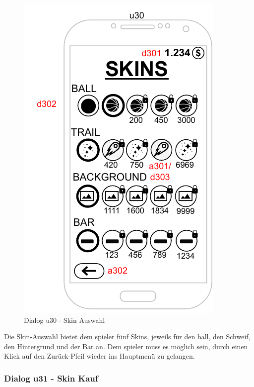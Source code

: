 \begin{figure}
    \begin{center}
    \includegraphics{diagramme/pdf/Mockup-u30.pdf}
\end{center}
    \caption{Dialog u30 - Skin Auswahl}
\end{figure}

Die Skin-Auswahl bietet dem \gls{spieler} fünf Skins, jeweils für den \gls{ball}, den Schweif, den Hintergrund und der Bar an.
Dem \gls{spieler} muss es möglich sein, durch einen Klick auf den Zurück-Pfeil wieder ins Hauptmenü zu gelangen.
\clearpage

\subsubsection{Dialog u31 - Skin Kauf}

